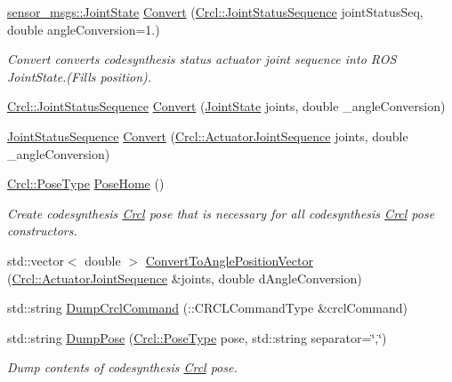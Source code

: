 \begin{DoxyCompactItemize}
\hyperlink{RCS_8h_aa4adb93a26caa4dacba9c9614e283245}{sensor\-\_\-msgs\-::\-Joint\-State} \hyperlink{namespaceCrcl_a84440a94ca5992cf4a01e4215d1cb363}{Convert} (\hyperlink{namespaceCrcl_a8e2d423195eeffb85b45b63f595f2825}{Crcl\-::\-Joint\-Status\-Sequence} joint\-Status\-Seq, double angle\-Conversion=1.)
\begin{DoxyCompactList}\small\item\em Convert converts codesynthesis status actuator joint sequence into R\-O\-S Joint\-State.(Fills position). \end{DoxyCompactList}\item 
\hyperlink{namespaceCrcl_a8e2d423195eeffb85b45b63f595f2825}{Crcl\-::\-Joint\-Status\-Sequence} \hyperlink{namespaceCrcl_a2a88d5186b3c539f968de637937294fb}{Convert} (\hyperlink{RCS_8h_aa4adb93a26caa4dacba9c9614e283245}{Joint\-State} joints, double \-\_\-angle\-Conversion)
\item 
\hyperlink{namespaceCrcl_a8e2d423195eeffb85b45b63f595f2825}{Joint\-Status\-Sequence} \hyperlink{namespaceCrcl_aa0e865c06943bf013c06bdc6fa538760}{Convert} (\hyperlink{namespaceCrcl_af084766e8e2d38a135cc67ef54d9904d}{Crcl\-::\-Actuator\-Joint\-Sequence} joints, double \-\_\-angle\-Conversion)
\item 
\hyperlink{namespaceCrcl_acc6c82b52280f4d0e74b82a92400956e}{Crcl\-::\-Pose\-Type} \hyperlink{namespaceCrcl_a5e9036e140bcf2156b7995085f36d75f}{Pose\-Home} ()
\begin{DoxyCompactList}\small\item\em Create codesynthesis \hyperlink{namespaceCrcl}{Crcl} pose that is necessary for all codesynthesis \hyperlink{namespaceCrcl}{Crcl} pose constructors. \end{DoxyCompactList}\item 
std\-::vector$<$ double $>$ \hyperlink{namespaceCrcl_a942871711b02866236621b132bf934c2}{Convert\-To\-Angle\-Position\-Vector} (\hyperlink{namespaceCrcl_af084766e8e2d38a135cc67ef54d9904d}{Crcl\-::\-Actuator\-Joint\-Sequence} \&joints, double d\-Angle\-Conversion)
\item 
std\-::string \hyperlink{namespaceCrcl_a1726015b66be8193fcd10bc157661a3d}{Dump\-Crcl\-Command} (\-::C\-R\-C\-L\-Command\-Type \&crcl\-Command)
\item 
std\-::string \hyperlink{namespaceCrcl_a30019a860966a9cdaa1564cc95787de4}{Dump\-Pose} (\hyperlink{namespaceCrcl_acc6c82b52280f4d0e74b82a92400956e}{Crcl\-::\-Pose\-Type} pose, std\-::string separator=\char`\"{},\char`\"{})
\begin{DoxyCompactList}\small\item\em Dump contents of codesynthesis \hyperlink{namespaceCrcl}{Crcl} pose. \end{DoxyCompactList}\item 

\end{DoxyCompactItemize}
